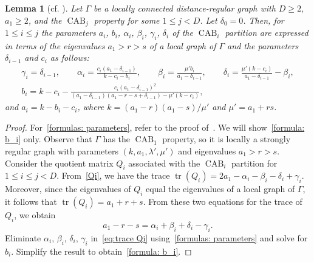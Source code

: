 \documentclass[11pt]{article}
\newtheorem{lemm}[theo]{Lemma}
\theoremstyle{definition}
\numberwithin{equation}{section}
\numberwithin{equation}{section}
\begin{document}
\begin{lemm}[cf. {\cite[Theorem 2.7]{JK2000-1}}] \label{lem:CAB parameters}
Let $\Gamma$ be a locally connected distance-regular graph with $D\geqslant 2$, $a_1\geqslant 2$, and the $\operatorname{CAB}_j$ property for some $1\leqslant j<D$. Let $\delta_0=0$.
Then, for $1\leqslant i \leqslant j$ the parameters $a_i$, $b_i$, $\alpha_i$, $\beta_i$, $\gamma_i$, $\delta_i$ of the $\operatorname{CAB}_i$ partition are expressed in terms of the eigenvalues $a_1>r>s$ of a local graph of $\Gamma$ and the parameters $\delta_{i-1}$ and $c_i$ as follows:
\begin{gather}
	\gamma_i  = \delta_{i-1}, \qquad
	\alpha_i = \frac{c_i(a_1-\delta_{i-1})}{k-c_i-b_i}, \qquad
	\beta_i = \frac{\mu'b_i}{a_1-\delta_{i-1}}, \qquad
	\delta_i = \frac{\mu'(k-c_i)}{a_1-\delta_{i-1}} - \beta_i, 	\label{formulas: parameters} \\
	b_i  = k - c_i - \frac{c_i(a_1 - \delta_{i-1})^2}{(a_1-\delta_{i-1})(a_1 - r - s + \delta_{i-1}) - \mu'(k-c_i)}, \label{formula: b_i}
\end{gather}
and $a_i = k - b_i - c_i$, where $k=(a_1-r)(a_1-s)/\mu'$ and $\mu'=a_1+rs$.
\end{lemm}
\begin{proof}
For~\eqref{formulas: parameters}, refer to the proof of~\cite[Theorem 2.7]{JK2000-1}.
We will show~\eqref{formula: b_i} only.
Observe that $\Gamma$ has the $\operatorname{CAB}_1$ property, so it is locally a strongly regular graph with parameters $(k,a_1, \lambda', \mu')$ and eigenvalues $a_1 > r > s$.
Consider the quotient matrix $Q_i$ associated with the $\operatorname{CAB}_i$ partition for $1\leqslant i \leqslant j < D$.
From~\eqref{Qi}, we have the trace $\operatorname{tr}(Q_i) = 2a_1 - \alpha_i - \beta_i - \delta_i + \gamma_i$.
Moreover, since the eigenvalues of $Q_i$ equal the eigenvalues of a local graph of $\Gamma$, it follows that $\operatorname{tr}(Q_i) = a_1 + r + s$.
From these two equations for the trace of $Q_i$, we obtain
\begin{equation}\label{eq:trace Qi}
	a_1 - r - s  = \alpha_i+\beta_i+\delta_i - \gamma_i .
\end{equation}
Eliminate $\alpha_i$, $\beta_i$, $\delta_i$, $\gamma_i$ in~\eqref{eq:trace Qi} using~\eqref{formulas: parameters} and solve for $b_i$. 
Simplify the result to obtain~\eqref{formula: b_i}.
\end{proof}
\end{document}
